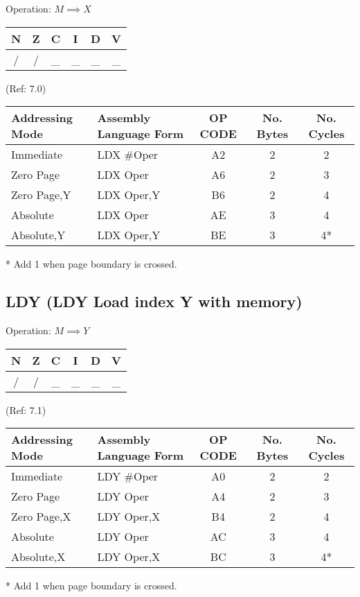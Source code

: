 \documentclass{article}
\begin{document}
  Operation:  $M \implies X$
  \begin{table}[H]
  \centering
  \begin{tabular}{|c c c c c c|}
  \hline
  N&Z&C&I&D&V\\
  \hline
  / & / & \_ & \_ & \_ & \_\\
  \hline
  \end{tabular}
  \end{table}
                                 (Ref: 7.0)
  \begin{table}[H]
  \centering
  \begin{tabular}{|l|l|c|c|c|}
  \hline
   Addressing Mode& Assembly Language Form& OP CODE &No. Bytes&No. Cycles\\
  \hline
    Immediate     &   LDX \#Oper           &    A2   &    2    &    2     \\
    Zero Page     &   LDX Oper            &    A6   &    2    &    3     \\
    Zero Page,Y   &   LDX Oper,Y          &    B6   &    2    &    4     \\
    Absolute      &   LDX Oper            &    AE   &    3    &    4     \\
    Absolute,Y    &   LDX Oper,Y          &    BE   &    3    &    4*    \\
  \hline
  \end{tabular}
  \end{table}
  * Add 1 when page boundary is crossed.

  \subsection{LDY (LDY Load index Y with memory)}
  
  Operation:  $M \implies Y$
  \begin{table}[H]
  \centering
  \begin{tabular}{|c c c c c c|}
  \hline
  N&Z&C&I&D&V\\
  \hline
  / & / & \_ & \_ & \_ & \_\\
  \hline
  \end{tabular}
  \end{table}
                                 (Ref: 7.1)
  \begin{table}[H]
  \centering
  \begin{tabular}{|l|l|c|c|c|}
  \hline
   Addressing Mode& Assembly Language Form& OP CODE &No. Bytes&No. Cycles\\
  \hline
    Immediate     &   LDY \#Oper          &    A0   &    2    &    2     \\
    Zero Page     &   LDY Oper            &    A4   &    2    &    3     \\
    Zero Page,X   &   LDY Oper,X          &    B4   &    2    &    4     \\
    Absolute      &   LDY Oper            &    AC   &    3    &    4     \\
    Absolute,X    &   LDY Oper,X          &    BC   &    3    &    4*    \\
  \hline
  \end{tabular}
  \end{table}
  * Add 1 when page boundary is crossed.
\end{document}
